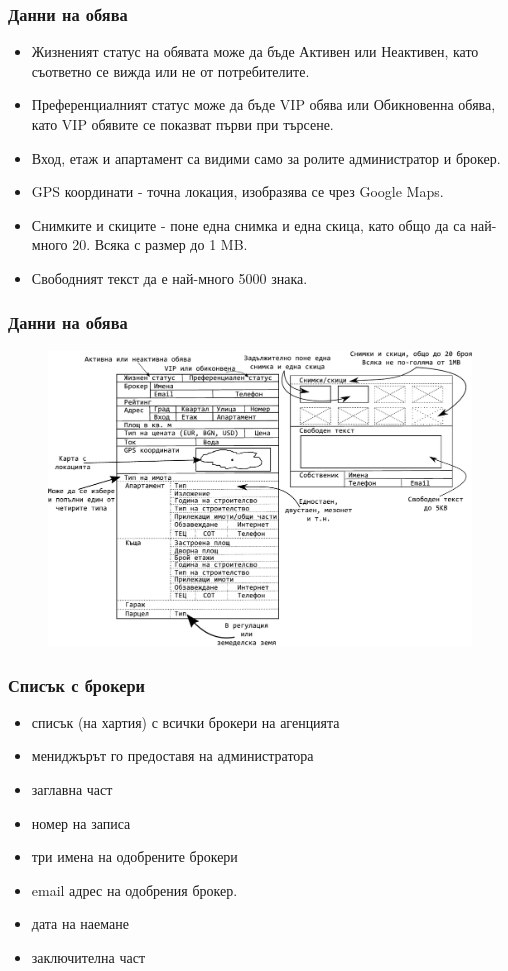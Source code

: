 \documentclass[12pt]{beamer}
\begin{document}
\begin{frame}[fragile]
\frametitle{Данни на обява}
		\begin{itemize}
		\item Жизненият статус на обявата може да бъде Активен или Неактивен, като съответно се вижда или не от потребителите.
		\item Преференциалният статус може да бъде VIP обява или Обикновенна обява, като VIP обявите се показват първи при търсене.
		\item Вход, етаж и апартамент са видими само за ролите администратор и брокер.
		\item GPS координати - точна локация, изобразява се чрез Google Maps.
		\item Снимките и скиците - поне една снимка и една скица, като общо да са най-много 20. Всяка с размер до 1 MB.
		\item Свободният текст да е най-много 5000 знака.
		\end{itemize}
\end{frame}

\begin{frame}[fragile]
\frametitle{Данни на обява}
	\begin{figure}[h]
	\centering
	\includegraphics[scale=0.50]{art-offer}
	\end{figure}
\end{frame}

\begin{frame}[fragile]
\frametitle{Списък с брокери}
	\begin{itemize}
	\item списък (на хартия) с всички брокери на агенцията
	\item мениджърът го предоставя на администратора
	\item заглавна част
	\item номер на записа
	\item три имена на одобрените брокери
	\item email адрес на одобрения брокер.
	\item дата на наемане
	\item заключителна част
	\end{itemize}		
\end{frame}
\end{document}
